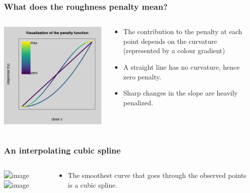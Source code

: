 \documentclass[aspectratio=169]{beamer}
\begin{document}
\begin{frame}
  \frametitle{What does the roughness penalty mean?}

   \begin{columns}
    \begin{column}{5cm}
      \includegraphics[scale=0.4]{figures/penalty2.png}
    \end{column}
    \begin{column}{6cm}
      \begin{itemize}
      \item The contribution to the penalty at each point depends on the
        curvature (represented by a colour gradient)
      \item A straight line has no curvature, hence zero penalty.
      \item Sharp changes in the slope are heavily penalized.
      \end{itemize}
    \end{column}
  \end{columns}

\end{frame}
    
\begin{frame}
  \frametitle{An interpolating cubic spline}

    \begin{columns}
    \begin{column}{6cm}
      \includegraphics<1>[scale=0.4]{figures/dose-response-points.png}
      \includegraphics<2>[scale=0.4]{figures/dose-response-cubic.png}
    \end{column}
    \begin{column}{6cm}
      \begin{itemize}
      \item The smoothest curve that goes through the observed
        points is a cubic spline.
      \end{itemize}
    \end{column}
  \end{columns}

\end{frame}
\end{document}
